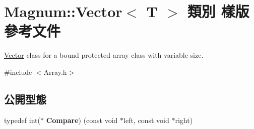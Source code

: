 \hypertarget{class_magnum_1_1_vector}{}\section{Magnum\+:\+:Vector$<$ T $>$ 類別 樣版 參考文件}
\label{class_magnum_1_1_vector}


\hyperlink{class_magnum_1_1_vector}{Vector} class for a bound protected array class with variable size.  




{\ttfamily \#include $<$Array.\+h$>$}

\subsection*{公開型態}
\begin{DoxyCompactItemize}
\item 
typedef int($\ast$ {\bfseries Compare}) (const void $\ast$left, const void $\ast$right)\hypertarget{class_magnum_1_1_vector_a6b5120c3159dcd25eca315281c2a35c7}{}\label{class_magnum_1_1_vector_a6b5120c3159dcd25eca315281c2a35c7}

\end{DoxyCompactItemize}

